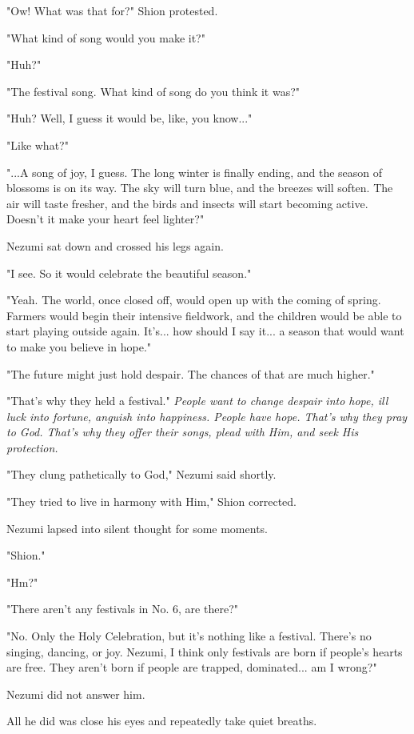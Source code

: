 "Ow! What was that for?" Shion protested.

"What kind of song would you make it?"

"Huh?"

"The festival song. What kind of song do you think it was?"

"Huh? Well, I guess it would be, like, you know..."

"Like what?"

"...A song of joy, I guess. The long winter is finally ending, and the season of blossoms is on its way. The sky will turn blue, and the breezes will soften. The air will taste fresher, and the birds and insects will start becoming active. Doesn't it make your heart feel lighter?"

Nezumi sat down and crossed his legs again.

"I see. So it would celebrate the beautiful season."

"Yeah. The world, once closed off, would open up with the coming of spring. Farmers would begin their intensive fieldwork, and the children would be able to start playing outside again. It's... how should I say it... a season that would want to make you believe in hope."

"The future might just hold despair. The chances of that are much higher."

"That's why they held a festival." \emph{People want to change despair into hope, ill luck into fortune, anguish into happiness. People have hope. That's why they pray to God. That's why they offer their songs, plead with Him, and seek His protection.}

"They clung pathetically to God," Nezumi said shortly.

"They tried to live in harmony with Him," Shion corrected.

Nezumi lapsed into silent thought for some moments.

"Shion."

"Hm?"

"There aren't any festivals in No. 6, are there?"

"No. Only the Holy Celebration, but it's nothing like a festival. There's no singing, dancing, or joy. Nezumi, I think only festivals are born if people's hearts are free. They aren't born if people are trapped, dominated... am I wrong?"

Nezumi did not answer him.

All he did was close his eyes and repeatedly take quiet breaths.

